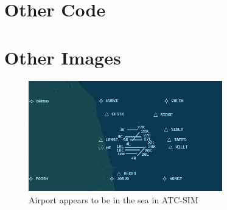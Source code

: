\documentclass{article}
\begin{document}
\printnoidxglossaries

\begin{appendices}
\section{Other Code}\label{appendix:otherfunctions}


\section{Other Images}\label{appendix:otherimages}
\begin{figure}[H]
\centering
\includegraphics[width=0.75\textwidth]{existing_solutions/airportinseaatcsim.png}
\caption{\label{fig:airportinseaatcsim}Airport appears to be in the sea in ATC-SIM}
\end{figure}
\end{appendices}
\end{document}
